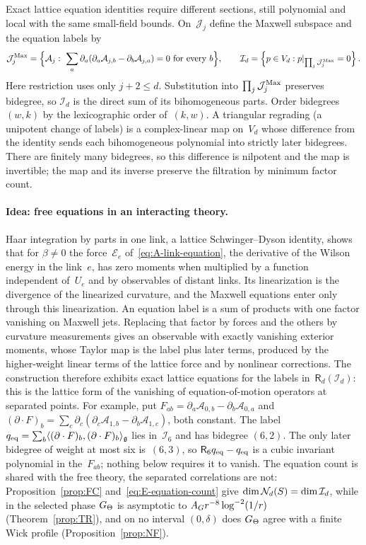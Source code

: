 Exact lattice equation identities require different sections, still polynomial and local with the same small-field bounds. On~$\mathcal J_j$ define the Maxwell subspace and the equation labels by
\begin{equation*}
\mathcal J_j^{\rm Max}=\Bigl\{\mathcal A_j:\ \sum_a\partial_a(\partial_a\mathcal A_{j,b}-\partial_b\mathcal A_{j,a})=0\ \text{for every }b\Bigr\},\qquad
\mathcal I_d=\Bigl\{p\in V_d:p|_{\prod_j\mathcal J_j^{\rm Max}}=0\Bigr\}\,.
\end{equation*}
Here restriction uses only $j+2\le d$. Substitution into $\prod_j\mathcal J_j^{\rm Max}$ preserves bidegree, so $\mathcal I_d$ is the direct sum of its bihomogeneous parts. Order bidegrees~$(w,k)$ by the lexicographic order of~$(k,w)$. A triangular regrading (a unipotent change of labels) is a complex-linear map on~$V_d$ whose difference from the identity sends each bihomogeneous polynomial into strictly later bidegrees. There are finitely many bidegrees, so this difference is nilpotent and the map is invertible; the map and its inverse preserve the filtration by minimum factor count.

\paragraph{Idea: free equations in an interacting theory.} Haar integration by parts in one link, a lattice Schwinger--Dyson identity, shows that for $\beta\ne0$ the force~$\mathcal E_e$ of~\eqref{eq:A-link-equation}, the derivative of the Wilson energy in the link~$e$, has zero moments when multiplied by a function independent of~$U_e$ and by observables of distant links. Its linearization is the divergence of the linearized curvature, and the Maxwell equations enter only through this linearization. An equation label is a sum of products with one factor vanishing on Maxwell jets. Replacing that factor by forces and the others by curvature measurements gives an observable with exactly vanishing exterior moments, whose Taylor map is the label plus later terms, produced by the higher-weight linear terms of the lattice force and by nonlinear corrections. The construction therefore exhibits exact lattice equations for the labels in~$\mathsf R_d(\mathcal I_d)$: this is the lattice form of the vanishing of equation-of-motion operators at separated points. For example, put $F_{ab}=\partial_a\mathcal A_{0,b}-\partial_b\mathcal A_{0,a}$ and $(\partial\cdot F)_b=\sum_c\partial_c(\partial_c\mathcal A_{1,b}-\partial_b\mathcal A_{1,c})$, both constant. The label $q_{\rm eq}=\sum_b\langle(\partial\cdot F)_b,(\partial\cdot F)_b\rangle_{\mathfrak{g}}$ lies in~$\mathcal I_6$ and has bidegree $(6,2)$. The only later bidegree of weight at most six is~$(6,3)$, so $\mathsf R_6q_{\rm eq}-q_{\rm eq}$ is a cubic invariant polynomial in the~$F_{ab}$; nothing below requires it to vanish. The equation count is shared with the free theory, the separated correlations are not: Proposition~\ref{prop:FC} and~\eqref{eq:E-equation-count} give $\dim\mathcal{N}_{d}(S)=\dim\mathcal I_d$, while in the selected phase $G_{\Theta}$ is asymptotic to $A_G r^{-8}\log^{-2}(1/r)$ (Theorem~\ref{prop:TR}), and on no interval $(0,\delta)$ does $G_{\Theta}$ agree with a finite Wick profile (Proposition~\ref{prop:NF}).

